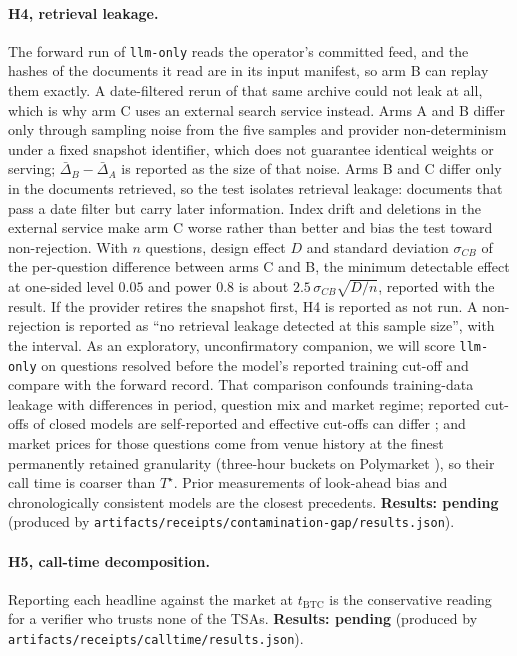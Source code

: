 \documentclass[11pt]{article}
\newcommand{\Ts}{T^{\star}}
\newcommand{\pending}[1]{\textbf{Results: pending} (produced by \nolinkurl{#1}).}
\begin{document}
\paragraph{H4, retrieval leakage.} The forward run of \texttt{llm-only} reads the operator's committed feed, and the hashes of the documents it read are in its input manifest, so arm B can replay them exactly. A date-filtered rerun of that same archive could not leak at all, which is why arm C uses an external search service instead. Arms A and B differ only through sampling noise from the five samples and provider non-determinism under a fixed snapshot identifier, which does not guarantee identical weights or serving; $\bar\Delta_B - \bar\Delta_A$ is reported as the size of that noise. Arms B and C differ only in the documents retrieved, so the test isolates retrieval leakage: documents that pass a date filter but carry later information. Index drift and deletions in the external service make arm C worse rather than better and bias the test toward non-rejection. With $n$ questions, design effect $D$ and standard deviation $\sigma_{CB}$ of the per-question difference between arms C and B, the minimum detectable effect at one-sided level $0.05$ and power $0.8$ is about $2.5\,\sigma_{CB}\sqrt{D/n}$, reported with the result. If the provider retires the snapshot first, H4 is reported as not run. A non-rejection is reported as ``no retrieval leakage detected at this sample size'', with the interval. As an exploratory, unconfirmatory companion, we will score \texttt{llm-only} on questions resolved before the model's reported training cut-off and compare with the forward record. That comparison confounds training-data leakage with differences in period, question mix and market regime; reported cut-offs of closed models are self-reported and effective cut-offs can differ \citep{cheng2024dated}; and market prices for those questions come from venue history at the finest permanently retained granularity (three-hour buckets on Polymarket \citep{polymarket_prices}), so their call time is coarser than $\Ts$. Prior measurements of look-ahead bias \citep{lopezlira2025memorization,glasserman2023lookahead} and chronologically consistent models \citep{he2025chrono} are the closest precedents. \pending{artifacts/receipts/contamination-gap/results.json}

\paragraph{H5, call-time decomposition.} Reporting each headline against the market at $t_{\mathrm{BTC}}$ is the conservative reading for a verifier who trusts none of the TSAs. \pending{artifacts/receipts/calltime/results.json}
\end{document}
